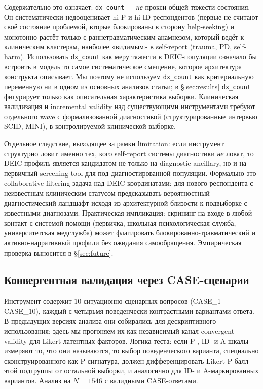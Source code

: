 Содержательно это означает: \texttt{dx\_count} --- \emph{не} прокси общей тяжести состояния. Он систематически недооценивает hi-P и hi-ID респондентов (первые не считают своё состояние проблемой, вторые блокированы в сторону help-seeking) и монотонно растёт только с раннетравматическим анамнезом, который ведёт к клиническим кластерам, наиболее «видимым» в self-report (trauma, PD, self-harm). Использовать \texttt{dx\_count} как меру тяжести в DEIC-популяции означало бы встроить в модель то самое систематическое смещение, которое архитектура конструкта описывает. Мы поэтому не используем \texttt{dx\_count} как критериальную переменную ни в одном из основных анализов статьи; в §\ref{sec:results} \texttt{dx\_count} фигурирует только как описательная характеристика выборки. Клиническая валидизация и incremental validity над существующими инструментами требуют отдельного wave с формализованной диагностикой (структурированные интервью SCID, MINI), в контролируемой клинической выборке.

Отдельное следствие, выходящее за рамки limitation: если инструмент структурно ловит именно тех, кого self-report системы диагностики \emph{не} ловят, то DEIC-профиль является кандидатом не только на diagnostic-ancillary, но и на первичный screening-tool для под-диагностированной популяции. Формально это collaborative-filtering задача над DEIC-координатами: для нового респондента с неизвестным клиническим статусом предсказывать вероятностный диагностический ландшафт исходя из архитектурной близости к подвыборке с известными диагнозами. Практическая импликация: скрининг на входе в любой контакт с системой помощи (первичка, школьная психологическая служба, университетская медслужба) может флагировать блокированно-травматический и активно-нарративный профили без ожидания самообращения. Эмпирическая проверка выносится в §\ref{sec:future}.

\subsection{Конвергентная валидация через CASE-сценарии}
\label{subsec:case_convergent}

Инструмент содержит $10$ ситуационно-сценарных вопросов (CASE\_1--CASE\_10), каждый с четырьмя поведенчески-контрастными вариантами ответа. В предыдущих версиях анализа они собирались для дескриптивного использования; здесь мы прогоняем их как независимый канал convergent validity для Likert-латентных факторов. Логика теста: если P-, ID- и A-шкалы измеряют то, что они называются, то выбор поведенческого варианта, специально сконструированного как P-сигнатура, должен дифференцировать Likert-P-балл этой подгруппы от остальной выборки, и аналогично для ID- и A-маркированных вариантов. Анализ на $N = 1546$ с валидными CASE-ответами.

